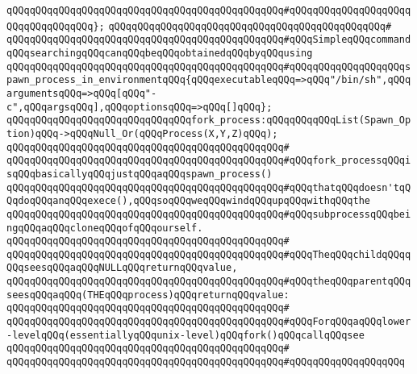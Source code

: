 \verb|qQQqqQQqqQQqqQQqqQQqqQQqqQQqqQQqqQQqqQQqqQQqqQQq#qQQqqQQqqQQqqQQqqQQqqQQqqQQqqQQqqQQq};|\newline
\verb|qQQqqQQqqQQqqQQqqQQqqQQqqQQqqQQqqQQqqQQqqQQqqQQq#|\newline
\verb|qQQqqQQqqQQqqQQqqQQqqQQqqQQqqQQqqQQqqQQqqQQqqQQq#qQQqSimpleqQQqcommandqQQqsearchingqQQqcanqQQqbeqQQqobtainedqQQqbyqQQqusing|\newline
\verb|qQQqqQQqqQQqqQQqqQQqqQQqqQQqqQQqqQQqqQQqqQQqqQQq#qQQqqQQqqQQqqQQqqQQqspawn_process_in_environmentqQQq{qQQqexecutableqQQq=>qQQq"/bin/sh",qQQqargumentsqQQq=>qQQq[qQQq"-c",qQQqargsqQQq],qQQqoptionsqQQq=>qQQq[]qQQq};|\newline
\newline
\verb|qQQqqQQqqQQqqQQqqQQqqQQqqQQqqQQqfork_process:qQQqqQQqqQQqList(Spawn_Option)qQQq->qQQqNull_Or(qQQqProcess(X,Y,Z)qQQq);|\newline
\verb|qQQqqQQqqQQqqQQqqQQqqQQqqQQqqQQqqQQqqQQqqQQqqQQq#|\newline
\verb|qQQqqQQqqQQqqQQqqQQqqQQqqQQqqQQqqQQqqQQqqQQqqQQq#qQQqfork_processqQQqisqQQqbasicallyqQQqjustqQQqaqQQqspawn_process()|\newline
\verb|qQQqqQQqqQQqqQQqqQQqqQQqqQQqqQQqqQQqqQQqqQQqqQQq#qQQqthatqQQqdoesn'tqQQqdoqQQqanqQQqexece(),qQQqsoqQQqweqQQqwindqQQqupqQQqwithqQQqthe|\newline
\verb|qQQqqQQqqQQqqQQqqQQqqQQqqQQqqQQqqQQqqQQqqQQqqQQq#qQQqsubprocessqQQqbeingqQQqaqQQqcloneqQQqofqQQqourself.|\newline
\verb|qQQqqQQqqQQqqQQqqQQqqQQqqQQqqQQqqQQqqQQqqQQqqQQq#|\newline
\verb|qQQqqQQqqQQqqQQqqQQqqQQqqQQqqQQqqQQqqQQqqQQqqQQq#qQQqTheqQQqchildqQQqqQQqseesqQQqaqQQqNULLqQQqreturnqQQqvalue,|\newline
\verb|qQQqqQQqqQQqqQQqqQQqqQQqqQQqqQQqqQQqqQQqqQQqqQQq#qQQqtheqQQqparentqQQqseesqQQqaqQQq(THEqQQqprocess)qQQqreturnqQQqvalue:|\newline
\verb|qQQqqQQqqQQqqQQqqQQqqQQqqQQqqQQqqQQqqQQqqQQqqQQq#|\newline
\verb|qQQqqQQqqQQqqQQqqQQqqQQqqQQqqQQqqQQqqQQqqQQqqQQq#qQQqForqQQqaqQQqlower-levelqQQq(essentiallyqQQqunix-level)qQQqfork()qQQqcallqQQqsee|\newline
\verb|qQQqqQQqqQQqqQQqqQQqqQQqqQQqqQQqqQQqqQQqqQQqqQQq#|\newline
\verb|qQQqqQQqqQQqqQQqqQQqqQQqqQQqqQQqqQQqqQQqqQQqqQQq#qQQqqQQqqQQqqQQqqQQq|\newline
